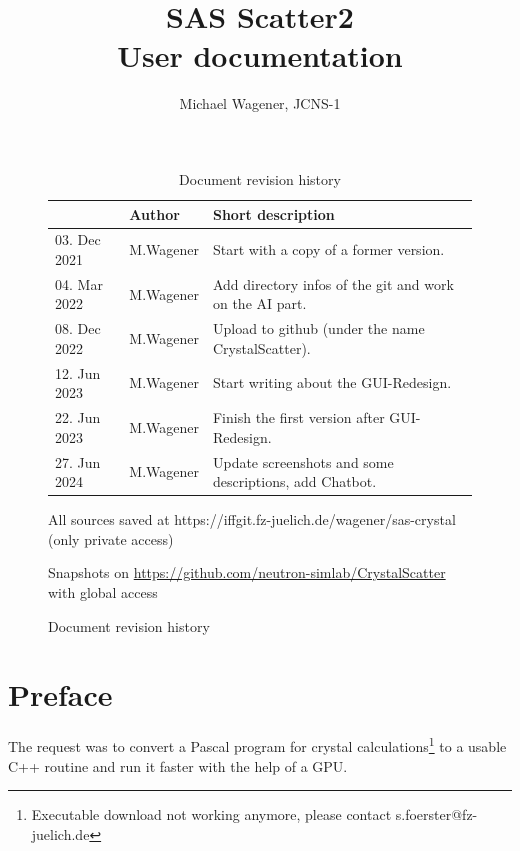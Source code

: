 \documentclass[11pt]{article} %
\author{Michael Wagener, JCNS-1}
\title{SAS Scatter2 \\[1ex] {\large User documentation}}
\begin{document}
\maketitle
\tableofcontents %

\clearpage
\begin{figure}  %
\begin{longtable}{|p{2.7cm}|p{2.6cm}|p{10.3cm}|}
\caption{Document revision history} \\
\hline\rowcolor{rowcolor}{\bf Date} & {\bf Author} & {\bf Short description} \\
\endfirsthead
\hline
03. Dec 2021 & M.Wagener & Start with a copy of a former version. \\ \hline
04. Mar 2022 & M.Wagener & Add directory infos of the git and work on the AI part. \\ \hline
08. Dec 2022 & M.Wagener & Upload to github (under the name CrystalScatter). \\ \hline
12. Jun 2023 & M.Wagener & Start writing about the GUI-Redesign. \\ \hline
22. Jun 2023 & M.Wagener & Finish the first version after GUI-Redesign. \\ \hline
27. Jun 2024 & M.Wagener & Update screenshots and some descriptions, add Chatbot. \\ \hline
\end{longtable}

\centerline{All sources saved at https://iffgit.fz-juelich.de/wagener/sas-crystal (only private access)}
\centerline{Snapshots on \url{https://github.com/neutron-simlab/CrystalScatter} with global access}
\end{figure}

\clearpage %


\section{Preface}

The request was to convert a Pascal program for crystal calculations\footnote{Executable download not working anymore, please contact s.foerster@fz-juelich.de}
to a usable C++ routine and run it faster with the help of a GPU.
\end{document}
